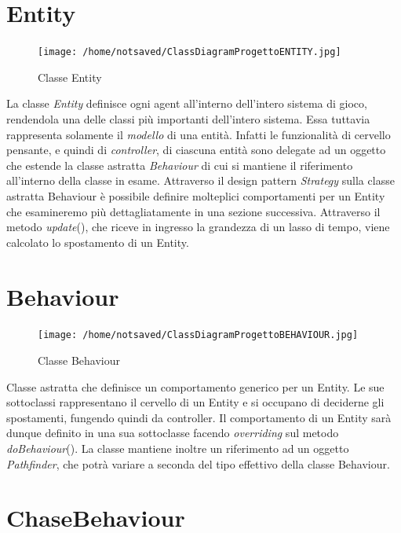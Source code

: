 \documentclass[12pt]{book}
\begin{document}
\section{Entity}

\begin{figure}[H]
\centering
\texttt{[image: /home/notsaved/ClassDiagramProgettoENTITY.jpg]}
\caption{Classe Entity}
\label{classentity}
\end{figure}

La classe \emph{Entity} definisce ogni agent all'interno dell'intero sistema di gioco, rendendola una delle classi pi\`u importanti dell'intero sistema. Essa tuttavia rappresenta solamente il \emph{modello} di una entit\`a. Infatti le funzionalit\`a di cervello pensante, e quindi di \emph{controller}, di ciascuna entit\`a sono delegate ad un oggetto che estende la classe astratta \emph{Behaviour} di cui si mantiene il riferimento all'interno della classe in esame. Attraverso il design pattern \emph{Strategy} sulla classe astratta Behaviour \`e possibile definire molteplici comportamenti per un Entity che esamineremo pi\`u dettagliatamente in una sezione successiva. Attraverso il metodo \emph{update}(), che riceve in ingresso la grandezza di un lasso di tempo, viene calcolato lo spostamento di un Entity.

\section{Behaviour}

\begin{figure}[H]
\centering
\texttt{[image: /home/notsaved/ClassDiagramProgettoBEHAVIOUR.jpg]}
\caption{Classe Behaviour}
\label{classbehaviour}
\end{figure}

Classe astratta che definisce un comportamento generico per un Entity. Le sue sottoclassi rappresentano il cervello di un Entity e si occupano di deciderne gli spostamenti, fungendo quindi da controller. Il comportamento di un Entity sar\`a dunque definito in una sua sottoclasse facendo \emph{overriding} sul metodo \emph{doBehaviour}(). La classe mantiene inoltre un riferimento ad un oggetto \emph{Pathfinder}, che potr\`a variare a seconda del tipo effettivo della classe Behaviour.

\section{ChaseBehaviour}
\end{document}
